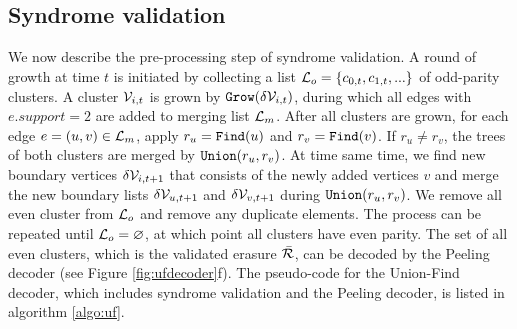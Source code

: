 \begin{algorithm}[htb]
  \BlankLine
  \BlankLine

  \BlankLine
  \caption{}\label{algo:ufgrow}
\end{algorithm}

\subsection{Syndrome validation}
We now describe the pre-processing step of syndrome validation. A round of growth at time $t$ is initiated by collecting a list $\mathcal{L}_o = \{c_{0,t}, c_{1,t}, ...\}$ of odd-parity clusters. A cluster $\mathcal{V}_{i,t}$ is grown by $\texttt{Grow}(\delta \mathcal{V}_{i,t})$, during which all edges with $e.support=2$ are added to merging list $\mathcal{L}_m$. After all clusters are grown, for each edge $e=(u,v) \in \mathcal{L}_m$, apply $r_u=\texttt{Find}(u)$ and $r_v=\texttt{Find}(v)$. If $r_u\neq r_v$, the trees of both clusters are merged by $\texttt{Union}(r_u,r_v)$. At time same time, we find new boundary vertices $\delta \mathcal{V}_{i,t+1}$ that consists of the newly added vertices $v$ and merge the new boundary lists $\delta \mathcal{V}_{u,t+1}$ and $\delta \mathcal{V}_{v,t+1}$ during $\texttt{Union}(r_u,r_v)$. We remove all even cluster from $\mathcal{L}_o$ and remove any duplicate elements. The process can be repeated until $\mathcal{L}_o=\varnothing$, at which point all clusters have even parity. The set of all even clusters, which is the validated erasure $\bar{\mathcal{R}}$, can be decoded by the Peeling decoder (see Figure \ref{fig:ufdecoder}f). The pseudo-code for the Union-Find decoder, which includes syndrome validation and the Peeling decoder, is listed in algorithm \ref{algo:uf}. 



